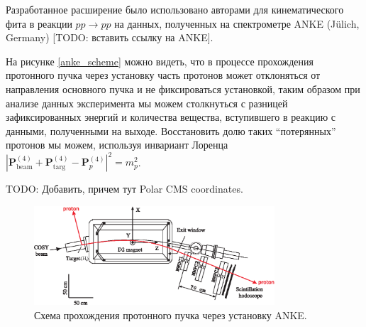 Разработанное расширение было использовано авторами для кинематического фита в реакции $pp \to pp$ на данных, полученных на спектрометре ANKE (Jülich, Germany) [TODO: вставить ссылку на ANKE].

На рисунке \eqref{anke_scheme} можно видеть, что в процессе прохождения протонного пучка через установку часть протонов может отклоняться от направления основного пучка и не фиксироваться установкой, таким образом при анализе данных эксперимента мы можем столкнуться с разницей зафиксированных энергий и количества вещества, вступившего в реакцию с данными, полученными на выходе. Восстановить долю таких ``потерянных'' протонов мы можем, используя инвариант Лоренца $\left|\boldsymbol{P}^{(4)}_\mathrm{beam}+\boldsymbol{P}^{(4)}_\mathrm{targ}-\boldsymbol{P}^{(4)}_p\right|^2 = m_p^2$.

TODO: Добавить, причем тут Polar CMS coordinates.

\begin{figure}[h]
\centering
\centering\includegraphics[width=0.8\textwidth]{pics/setup_.eps}
\caption{
Схема прохождения протонного пучка через установку ANKE.
}
\label{anke_scheme}
\end{figure}


